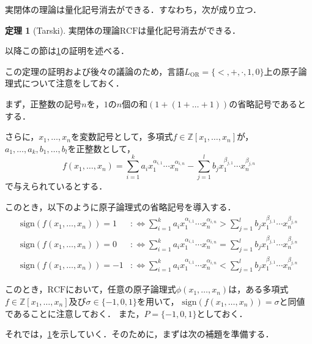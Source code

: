 \documentclass[uplatex, dvipdfmx]{jsarticle}
\numberwithin{equation}{section}
\newcommand{\Z}{\mathbb{Z}}
\newcommand{\defiff}{ :\Leftrightarrow}
\newcommand{\RCF}{\mathrm{RCF}}
\newcommand{\sign}{\mathrm{sign}}
\theoremstyle{definition}
\newtheorem{theorem}[definition]{定理}
\begin{document}
実閉体の理論は量化記号消去ができる．すなわち，次が成り立つ．

\begin{theorem}[Tarski]\label{theorem:Tarski}
     実閉体の理論$\RCF$は量化記号消去ができる．
\end{theorem}

以降この節は\cref{theorem:Tarski}の証明を述べる．

この定理の証明および後々の議論のため，言語$L_\mathrm{OR} = \{<, +, \cdot, 1, 0\}$上の原子論理式について注意をしておく．

まず，正整数の記号$n$を，$1$の$n$個の和$(1 + (1 + \dots + 1 ))$の省略記号であるとする．

さらに，$x_1, \dots, x_n$を変数記号として，多項式$f \in \Z[x_1, \dots, x_n]$が，$a_1, \dots, a_k, b_1, \dots, b_l$を正整数として，
\begin{equation}
     f(x_1, \dots, x_n) = \sum_{i=1}^k a_i x_1^{\alpha_{i,1}} \cdots x_n^{\alpha_{i,n}} - \sum_{j=1}^l b_j x_1^{\beta_{j,1}} \cdots x_n^{\beta_{j,n}}
\end{equation}
で与えられているとする．

このとき，以下のように原子論理式の省略記号を導入する．
\begin{align}
     \sign (f(x_1, \dots, x_n)) = 1 &\defiff \sum_{i=1}^k a_i x_1^{\alpha_{i,1}} \cdots x_n^{\alpha_{i,n}} > \sum_{j=1}^l b_j x_1^{\beta_{j,1}} \cdots x_n^{\beta_{j,n}}\\
     \sign (f(x_1, \dots, x_n)) = 0 &\defiff \sum_{i=1}^k a_i x_1^{\alpha_{i,1}} \cdots x_n^{\alpha_{i,n}} = \sum_{j=1}^l b_j x_1^{\beta_{j,1}} \cdots x_n^{\beta_{j,n}}\\
     \sign (f(x_1, \dots, x_n)) = -1 &\defiff \sum_{i=1}^k a_i x_1^{\alpha_{i,1}} \cdots x_n^{\alpha_{i,n}} < \sum_{j=1}^l b_j x_1^{\beta_{j,1}} \cdots x_n^{\beta_{j,n}}
\end{align}

このとき，$\RCF$において，任意の原子論理式$\phi(x_1, \dots, x_n)$は，ある多項式$f \in \Z[x_1, \dots, x_n]$及び$\sigma \in \{-1, 0, 1\}$を用いて，
$\sign(f(x_1, \dots, x_n)) = \sigma$と同値であることに注意しておく．
また，$P = \{-1, 0, 1\}$としておく．

それでは，\cref{theorem:Tarski}を示していく．そのために，まずは次の補題を準備する．
\end{document}

